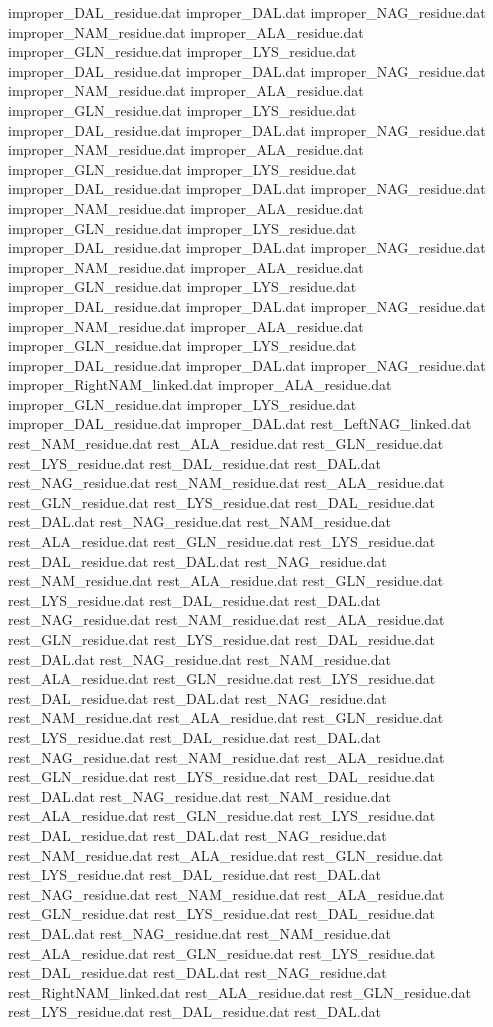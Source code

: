 improper_DAL_residue.dat
improper_DAL.dat
improper_NAG_residue.dat
improper_NAM_residue.dat
improper_ALA_residue.dat
improper_GLN_residue.dat
improper_LYS_residue.dat
improper_DAL_residue.dat
improper_DAL.dat
improper_NAG_residue.dat
improper_NAM_residue.dat
improper_ALA_residue.dat
improper_GLN_residue.dat
improper_LYS_residue.dat
improper_DAL_residue.dat
improper_DAL.dat
improper_NAG_residue.dat
improper_NAM_residue.dat
improper_ALA_residue.dat
improper_GLN_residue.dat
improper_LYS_residue.dat
improper_DAL_residue.dat
improper_DAL.dat
improper_NAG_residue.dat
improper_NAM_residue.dat
improper_ALA_residue.dat
improper_GLN_residue.dat
improper_LYS_residue.dat
improper_DAL_residue.dat
improper_DAL.dat
improper_NAG_residue.dat
improper_NAM_residue.dat
improper_ALA_residue.dat
improper_GLN_residue.dat
improper_LYS_residue.dat
improper_DAL_residue.dat
improper_DAL.dat
improper_NAG_residue.dat
improper_NAM_residue.dat
improper_ALA_residue.dat
improper_GLN_residue.dat
improper_LYS_residue.dat
improper_DAL_residue.dat
improper_DAL.dat
improper_NAG_residue.dat
improper_RightNAM_linked.dat
improper_ALA_residue.dat
improper_GLN_residue.dat
improper_LYS_residue.dat
improper_DAL_residue.dat
improper_DAL.dat
rest_LeftNAG_linked.dat
rest_NAM_residue.dat
rest_ALA_residue.dat
rest_GLN_residue.dat
rest_LYS_residue.dat
rest_DAL_residue.dat
rest_DAL.dat
rest_NAG_residue.dat
rest_NAM_residue.dat
rest_ALA_residue.dat
rest_GLN_residue.dat
rest_LYS_residue.dat
rest_DAL_residue.dat
rest_DAL.dat
rest_NAG_residue.dat
rest_NAM_residue.dat
rest_ALA_residue.dat
rest_GLN_residue.dat
rest_LYS_residue.dat
rest_DAL_residue.dat
rest_DAL.dat
rest_NAG_residue.dat
rest_NAM_residue.dat
rest_ALA_residue.dat
rest_GLN_residue.dat
rest_LYS_residue.dat
rest_DAL_residue.dat
rest_DAL.dat
rest_NAG_residue.dat
rest_NAM_residue.dat
rest_ALA_residue.dat
rest_GLN_residue.dat
rest_LYS_residue.dat
rest_DAL_residue.dat
rest_DAL.dat
rest_NAG_residue.dat
rest_NAM_residue.dat
rest_ALA_residue.dat
rest_GLN_residue.dat
rest_LYS_residue.dat
rest_DAL_residue.dat
rest_DAL.dat
rest_NAG_residue.dat
rest_NAM_residue.dat
rest_ALA_residue.dat
rest_GLN_residue.dat
rest_LYS_residue.dat
rest_DAL_residue.dat
rest_DAL.dat
rest_NAG_residue.dat
rest_NAM_residue.dat
rest_ALA_residue.dat
rest_GLN_residue.dat
rest_LYS_residue.dat
rest_DAL_residue.dat
rest_DAL.dat
rest_NAG_residue.dat
rest_NAM_residue.dat
rest_ALA_residue.dat
rest_GLN_residue.dat
rest_LYS_residue.dat
rest_DAL_residue.dat
rest_DAL.dat
rest_NAG_residue.dat
rest_NAM_residue.dat
rest_ALA_residue.dat
rest_GLN_residue.dat
rest_LYS_residue.dat
rest_DAL_residue.dat
rest_DAL.dat
rest_NAG_residue.dat
rest_NAM_residue.dat
rest_ALA_residue.dat
rest_GLN_residue.dat
rest_LYS_residue.dat
rest_DAL_residue.dat
rest_DAL.dat
rest_NAG_residue.dat
rest_NAM_residue.dat
rest_ALA_residue.dat
rest_GLN_residue.dat
rest_LYS_residue.dat
rest_DAL_residue.dat
rest_DAL.dat
rest_NAG_residue.dat
rest_RightNAM_linked.dat
rest_ALA_residue.dat
rest_GLN_residue.dat
rest_LYS_residue.dat
rest_DAL_residue.dat
rest_DAL.dat
